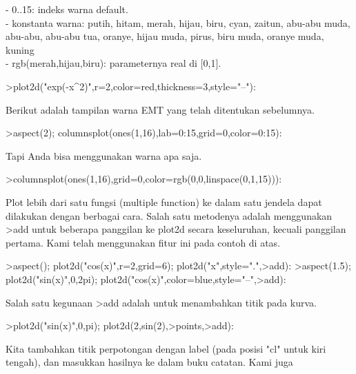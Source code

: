 \documentclass[a4paper,10pt]{article}
\begin{document}
\begin{eulernotebook}
\begin{eulercomment}
\begin{eulercomment}
\begin{eulercomment}
\begin{eulercomment}
\begin{eulercomment}
\begin{eulercomment}
\begin{eulercomment}
\begin{eulercomment}
\begin{eulercomment}
\begin{eulercomment}
\begin{eulercomment}
- 0..15: indeks warna default.\\
- konstanta warna: putih, hitam, merah, hijau, biru, cyan, zaitun,
abu-abu muda, abu-abu, abu-abu tua, oranye, hijau muda, pirus, biru
muda, oranye muda, kuning\\
- rgb(merah,hijau,biru): parameternya real di [0,1].
\end{eulercomment}
\begin{eulerprompt}
>plot2d("exp(-x^2)",r=2,color=red,thickness=3,style="--"):
\end{eulerprompt}
\begin{eulercomment}
Berikut adalah tampilan warna EMT yang telah ditentukan sebelumnya.
\end{eulercomment}
\begin{eulerprompt}
>aspect(2); columnsplot(ones(1,16),lab=0:15,grid=0,color=0:15):
\end{eulerprompt}
\begin{eulercomment}
Tapi Anda bisa menggunakan warna apa saja.
\end{eulercomment}
\begin{eulerprompt}
>columnsplot(ones(1,16),grid=0,color=rgb(0,0,linspace(0,1,15))):
\end{eulerprompt}
\begin{eulercomment}
Plot lebih dari satu fungsi (multiple function) ke dalam satu jendela
dapat dilakukan dengan berbagai cara. Salah satu metodenya adalah
menggunakan \textgreater{}add untuk beberapa panggilan ke plot2d secara
keseluruhan, kecuali panggilan pertama. Kami telah menggunakan fitur
ini pada contoh di atas.
\end{eulercomment}
\begin{eulerprompt}
>aspect(); plot2d("cos(x)",r=2,grid=6); plot2d("x",style=".",>add):
>aspect(1.5); plot2d("sin(x)",0,2pi); plot2d("cos(x)",color=blue,style="--",>add):
\end{eulerprompt}
\begin{eulercomment}
Salah satu kegunaan \textgreater{}add adalah untuk menambahkan titik pada kurva.
\end{eulercomment}
\begin{eulerprompt}
>plot2d("sin(x)",0,pi); plot2d(2,sin(2),>points,>add):
\end{eulerprompt}
\begin{eulercomment}
Kita tambahkan titik perpotongan dengan label (pada posisi "cl" untuk
kiri tengah), dan masukkan hasilnya ke dalam buku catatan. Kami juga

\end{eulercomment}
\end{eulercomment}
\end{eulercomment}
\end{eulercomment}
\end{eulercomment}
\end{eulercomment}
\end{eulercomment}
\end{eulercomment}
\end{eulercomment}
\end{eulercomment}
\end{eulercomment}
\end{eulernotebook}
\end{document}
